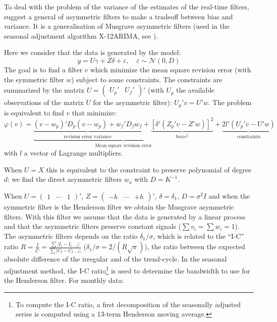 \documentclass[
  12pt,
  ,
  a4paper]{article}
\newcommand\1{\mathds{1}}
\begin{document}
To deal with the problem of the variance of the estimates of the real-time filters, \textcite{proietti2008} suggest a general of asymmetric filters to make a tradeoff between bias and variance.
It is a generalisation of Musgrave asymmetric filters (used in the seasonal adjustment algorithm X-12ARIMA, see \textcite{musgrave1964set}).

Here we consider that the data is generated by the model:
\[
y=U\gamma+Z\delta+\varepsilon,\quad
\varepsilon\sim\mathcal{N}(0,D)
\]
The goal is to find a filter \(v\) which minimize the mean square revision error (with the symmetric filter \(w\)) subject to some constraints.
The constraints are summarized by the matrix \(U=\begin{pmatrix}U_{p}'&U_{f}'\end{pmatrix}'\) (with \(U_p\) the available observations of the matrix \(U\) for the asymmetric filter): \(U_p'v=U'w\).
The problem is equivalent to find \(v\) that minimize:
\begin{equation}
\varphi(v)=
\underbrace{
  \underbrace{(v-w_{p})'D_{p}(v-w_{p})+
  w_{f}'D_{f}w_{f}}_\text{revision error variance}+
  \underbrace{[\delta'(Z_{p}'v-Z'w)]^{2}}_{biais^2}
}_\text{Mean square revision error}+
\underbrace{2l'(U_{p}'v-U'w)}_{\text{constraints}}
\label{eq:lppasym}
\end{equation}
with \(l\) a vector of Lagrange multipliers.

When \(U=X\) this is equivalent to the constraint to preserve polynomial of degree \(d\): we find the direct asymmetric filters \(w_a\) with \(D=K^{-1}\).

When \(U=\begin{pmatrix}1&\cdots&1\end{pmatrix}'\), \(Z=\begin{pmatrix}-h&\cdots&+h\end{pmatrix}'\), \(\delta=\delta_1\), \(D=\sigma^2I\) and when the symmetric filter is the Henderson filter we obtain the Musgrave asymmetric filters.
With this filter we assume that the data is generated by a linear process and that the asymmetric filters preserve constant signals (\(\sum v_i=\sum w_i=1\)).
The asymmetric filters depends on the ratio \(\delta_1/\sigma\), which is related to the ``I-C'' ratio \(R=\frac{\bar{I}}{\bar{C}}=\frac{\sum\lvert I_t-I_{t-1}\rvert}{\sum\lvert C_t-C_{t-1}\rvert}\) (\(\delta_1/\sigma=2/(R\sqrt{\pi})\)), the ratio between the expected absolute difference of the irregular and of the trend-cycle.
In the seasonal adjustment method, the I-C ratio\footnote{
  To compute the I-C ratio, a first decomposition of the seasonally adjusted series is computed using a 13-term Henderson moving average.} is used to determine the bandwidth to use for the Henderson filter. For monthly data:
\end{document}
